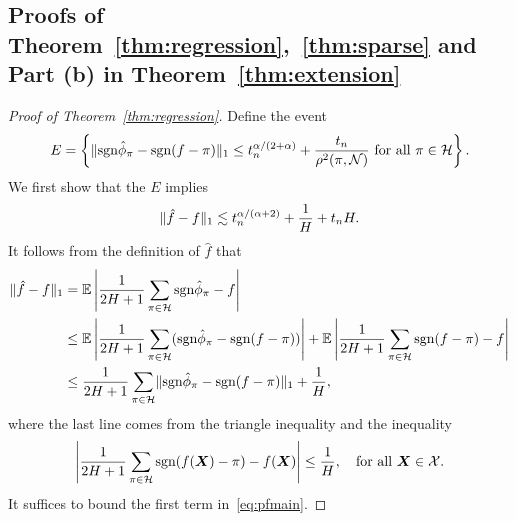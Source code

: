 \documentclass[11pt]{article}
\theoremstyle{plain}
\theoremstyle{definition}
\def\sign{\textup{sgn}}
\begin{document}
\subsection{Proofs of Theorem~\ref{thm:regression},~\ref{thm:sparse} and Part (b) in  Theorem~\ref{thm:extension}}\label{sec:regression}
\begin{proof}[Proof of Theorem~\ref{thm:regression}]
Define the event
\[
E=\left\{\onenormSize{}{\sign \hat \phi_\pi- \sign (f-\pi)} \leq t_n^{\alpha/(2+\alpha)}+{t_n\over \rho^2(\pi,\tN)} \text{ for all }\pi\in\tH\right\}.
\]
We first show that the $E$ implies
\begin{align}\label{eq:mb}
\lVert\hat f-f\rVert_1\lesssim t_n^{\alpha/(\alpha+2)}+{1\over H}+t_nH.
\end{align} 
It follows from the definition of $\hat f$ that
\begin{align}\label{eq:pfmain}
\onenormSize{}{\hat f-f}&=\mathbb{E}\left|{1\over 2H+1} \sum_{\pi\in \tH}\sign \hat \phi_\pi - f\right|\notag\\
&\leq \mathbb{E}\left|{1\over 2H+1}\sum_{\pi \in \tH} (\sign \hat \phi_\pi - \sign (f-\pi)) \right| +\mathbb{E}\left|{1\over 2H+1}\sum_{\pi \in \tH}\sign(f-\pi)-f\right|\notag\\
& \leq{1\over 2H+1}\sum_{\pi \in \tH}\onenormSize{}{\sign \hat \phi_\pi - \sign (f-\pi)}+{1\over H},
\end{align}
where the last line comes from the triangle inequality and the inequality
\[
\left|{1\over 2H+1}\sum_{\pi \in \tH}\sign(f(\mX)-\pi)-f(\mX)\right|\leq {1\over H}, \quad \text{for all } \mX\in\tX.
\]
It suffices to bound the first term in~\eqref{eq:pfmain}. 




\end{proof}
\end{document}
